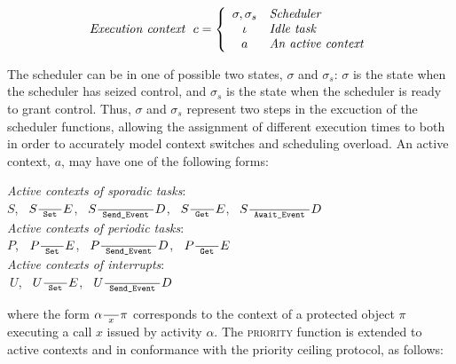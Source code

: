 \begin{displaymath} 
\centering
\textit{Execution context} \ \ c = 
  \left\{ \begin{array}{cl}
    \sigma,\sigma_s & \textit{Scheduler}\\
    \iota & \textit{Idle task}\\
    a & \textit{An active context}
  \end{array}
  \right.
\end{displaymath}

The scheduler can be in one of possible two states, $\sigma$ and
$\sigma_s$: $\sigma$ is the state when the scheduler has seized
control, and $\sigma_s$ is the state when the scheduler is ready to
grant control. Thus, $\sigma$ and $\sigma_s$ represent two steps in
the excuction of the scheduler functions, allowing the assignment of
different execution times to both in order to accurately model context
switches and scheduling overload. An active context, $a$, may have one
of the following forms:\\

\begin{center}
\emph{Active contexts of sporadic tasks}:\\
    \hspace*{2mm} $S$,  
	\  $S \frac{}{\text{\ttfamily\ Set\ }} E$, 
	\ $S \frac{}{\text{\ttfamily\ Send\_Event\ }} D$, 
	\ $S \frac{}{\text{\ttfamily\ Get\ }} E$, 
	\ $S  \frac{}{\text{\ttfamily\ Await\_Event\ }}  D$ \vspace{1mm} \\
\emph{Active contexts of periodic tasks}: \\
     \hspace*{2mm} $P$, 
	\  $P \frac{}{\text{\ttfamily\ Set\ }} E$, 
	\  $P \frac{}{\text{\ttfamily\ Send\_Event\ }} D$,  
	\  $P \frac{}{\text{\ttfamily\ Get\ }} E$ 	\vspace{2mm} \\
\emph{Active contexts of interrupts}: \\
     \hspace*{2mm} $\ U$, 
	\  $U \frac{}{\text{\ttfamily\ Set\ }} E$, 
	\  $U \frac{}{\text{\ttfamily\ Send\_Event\ }} D$  \\
\end{center}
%
%
where the form $\alpha \frac{}{\large \ x \ } \pi$ corresponds  to the context of a protected
object $\pi$ executing a call $x$ issued by activity
$\alpha$. The {\scshape priority} function is extended to active
contexts and in conformance with the priority ceiling protocol, as follows:

